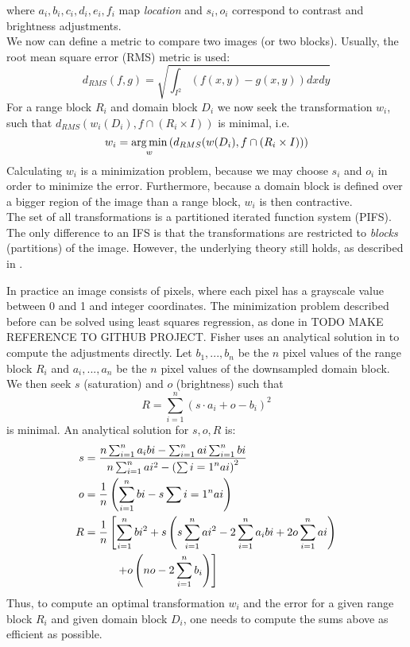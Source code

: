 where $a_i, b_i, c_i, d_i, e_i, f_i$ map \textit{location} and $s_i, o_i$ correspond to contrast and brightness adjustments.
\\
We now can define a metric to compare two images (or two blocks). Usually, the root mean square error (RMS) metric is used:
$$
d_{RMS}(f,g) = \sqrt{\int_{I^2} (f(x,y)-g(x,y))dxdy}
$$
For a range block $R_i$ and domain block $D_i$ we now seek the transformation $w_i$, such that $d_{RMS}(w_i(D_i), f \cap (R_i \times I))$ is minimal, i.e.
$$
    w_i = \operatorname*{arg\,min}_{w} \left( d_{RMS}(w(D_i), f \cap (R_i \times I)) \right)
$$
Calculating $w_i$ is a minimization problem, because we may choose $s_i$ and $o_i$ in order to minimize the error.
Furthermore, because a domain block is defined over a bigger region of the image than a range block, $w_i$ is then contractive. \\
The set of all transformations is a partitioned iterated function system (PIFS). The only difference to an IFS is that the transformations are restricted
to \textit{blocks} (partitions) of the image. However, the underlying theory still holds, as described in \cite{fisher2012}.

In practice an image consists of pixels, where each pixel has a grayscale value between 0 and 1 and integer coordinates.
The minimization problem described before can be solved using least squares regression, as done in TODO MAKE REFERENCE TO GITHUB PROJECT.
Fisher uses an analytical solution in \cite{fisher2012} to compute the adjustments directly. Let $b_1, ..., b_n$ be the $n$ pixel values of the range block $R_i$
and $a_i,...,a_n$ be the $n$ pixel values of the downsampled domain block. We then seek $s$ (saturation) and $o$ (brightness) such that
$$
R = \sum_{i=1}^n (s \cdot a_i + o - b_i)^2
$$
is minimal. An analytical solution for $s,o,R$ is:
\begin{align*}
    s &= \frac{n \sum_{i=1}^n a_i bi - \sum_{i=1}^n ai \sum_{i=1}^n bi}{n \sum_{i=1}^n ai^2 - \left(\sum{i=1}^n ai \right)^2} \\
    o &= \frac{1}{n} \left( \sum_{i=1}^n bi - s \sum_{}{i=1}^n ai \right) \\
    R &= \frac{1}{n} \left[ \sum_{i=1}^n bi^2 + s \left( s \sum_{i=1}^n ai^2 - 2 \sum_{i=1}^n a_i bi + 2o \sum_{i=1}^n ai \right) \right. \\
    &\text{\hspace{1cm}} \left. + o \left(no - 2 \sum_{i=1}^n b_i \right)  \right]
    \end{align*}
Thus, to compute an optimal transformation $w_i$ and the error for a given range block $R_i$ and given domain block $D_i$, one needs to compute the sums above
as efficient as possible.

